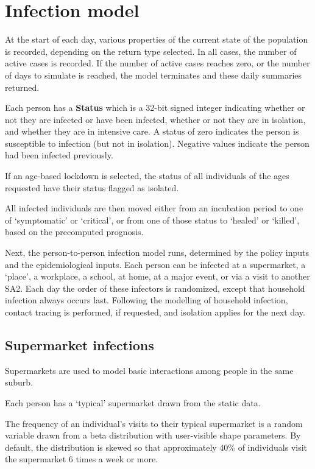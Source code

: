 \documentclass{grattan}
\begin{document}
\section{Infection model}

At the start of each day, various properties of the current state of the population is recorded, 
depending on the return type selected. In all cases, the number of active cases is recorded. 
If the number of active cases reaches zero, or the number of days to simulate is reached, the model
 terminates and these daily summaries returned.

Each person has a \textbf{Status} which is a 32-bit signed integer indicating whether or not
they are infected or have been infected, whether or not they are in isolation, and whether they are 
in intensive care. A status of zero indicates the person is susceptible to infection (but not
in isolation). Negative values indicate the person had been infected previously.


If an age-based lockdown is selected, the status of  all individuals of the ages requested have their
status flagged as isolated.

All infected individuals are then moved either from an incubation period to one of 
`symptomatic' or `critical', or from one of those status to `healed' or `killed', based
on the precomputed prognosis. 

Next, the person-to-person infection model runs, determined by the policy inputs and
the epidemiological inputs. Each person can be infected at a supermarket, a `place', 
a workplace, a school, at home, at a major event, or via a visit to another SA2. Each day
the order of these infectors is randomized, except that household infection always
occurs last. Following the modelling of household infection, contact tracing is performed,
if requested, and isolation applies for the next day.

\subsection{Supermarket infections}

Supermarkets are used to model basic interactions among people in the same suburb. 

Each person has a `typical' supermarket drawn from the static data.

The frequency of an individual's visits to their typical supermarket is a random variable
drawn from a beta distribution with user-visible shape parameters. By default, the distribution
is skewed so that approximately 40\% of individuals visit the supermarket 6 times a week or
more.
\end{document}
